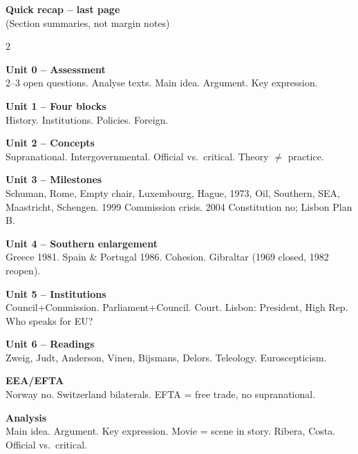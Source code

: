 \documentclass[8pt,landscape,a4paper]{article}
\begin{document}
\newpage
\vspace*{0.3em}
\begin{center}
\textbf{\color{eublue}Quick recap -- last page}\\[0.3em]
\small\textcolor{notegrey}{(Section summaries, not margin notes)}
\end{center}
\vspace{0.4em}
\noindent\color{notegrey}
\setlength{\parskip}{0.3em}
\begin{multicols}{2}

\textbf{Unit 0 -- Assessment}\\
2--3 open questions. Analyse texts. Main idea. Argument. Key expression.

\textbf{Unit 1 -- Four blocks}\\
History. Institutions. Policies. Foreign.

\textbf{Unit 2 -- Concepts}\\
Supranational. Intergovernmental. Official vs.\ critical. Theory $\neq$ practice.

\textbf{Unit 3 -- Milestones}\\
Schuman, Rome, Empty chair, Luxembourg, Hague, 1973, Oil, Southern, SEA, Maastricht, Schengen. 1999 Commission crisis. 2004 Constitution no; Lisbon Plan B.

\textbf{Unit 4 -- Southern enlargement}\\
Greece 1981. Spain \& Portugal 1986. Cohesion. Gibraltar (1969 closed, 1982 reopen).

\textbf{Unit 5 -- Institutions}\\
Council+Commission. Parliament+Council. Court. Lisbon: President, High Rep. Who speaks for EU?

\textbf{Unit 6 -- Readings}\\
Zweig, Judt, Anderson, Vinen, Bijsmans, Delors. Teleology. Euroscepticism.

\textbf{EEA/EFTA}\\
Norway no. Switzerland bilaterals. EFTA = free trade, no supranational.

\textbf{Analysis}\\
Main idea. Argument. Key expression. Movie = scene in story. Ribera, Costa. Official vs.\ critical.

\end{multicols}
\vfill
\normalsize\normalfont\color{black}
\end{document}
